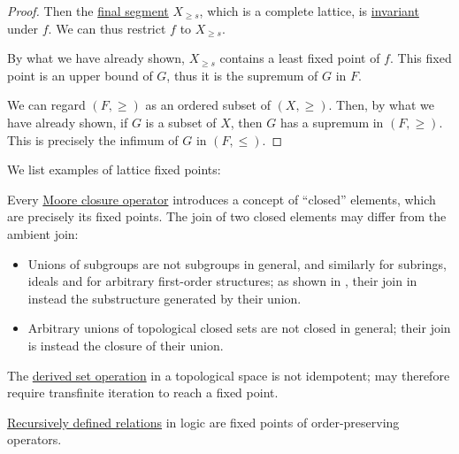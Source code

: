 \begin{proof}
  Then the \hyperref[def:order_interval/unbounded]{final segment} \( X_{\geq s} \), which is a complete lattice, is \hyperref[def:invariant_subset]{invariant} under \( f \). We can thus restrict \( f \) to \( X_{\geq s} \).

  By what we have already shown, \( X_{\geq s} \) contains a least fixed point of \( f \). This fixed point is an upper bound of \( G \), thus it is the supremum of \( G \) in \( F \).

   We can regard \( (F, \geq) \) as an ordered subset of \( (X, \geq) \). Then, by what we have already shown, if \( G \) is a subset of \( X \), then \( G \) has a supremum in \( (F, \geq) \). This is precisely the infimum of \( G \) in \( (F, \leq) \).
\end{proof}

\begin{example}\label{ex:thm:knaster_tarski}
  We list examples of lattice fixed points:
  \begin{thmenum}
     Every \hyperref[def:moore_closure_operator]{Moore closure operator} introduces a concept of \enquote{closed} elements, which are precisely its fixed points. The join of two closed elements may differ from the ambient join:
    \begin{itemize}
      \item Unions of subgroups are not subgroups in general, and similarly for subrings, ideals and for arbitrary first-order structures; as shown in , their join in instead the substructure generated by their union.
      \item Arbitrary unions of topological closed sets are not closed in general; their join is instead the closure of their union.
    \end{itemize}

     The \hyperref[def:derived_set]{derived set operation} in a topological space is not idempotent;  may therefore require transfinite iteration to reach a fixed point.

     \hyperref[con:recursively_defined_relation]{Recursively defined relations} in logic are fixed points of order-preserving operators.
  \end{thmenum}
\end{example}

